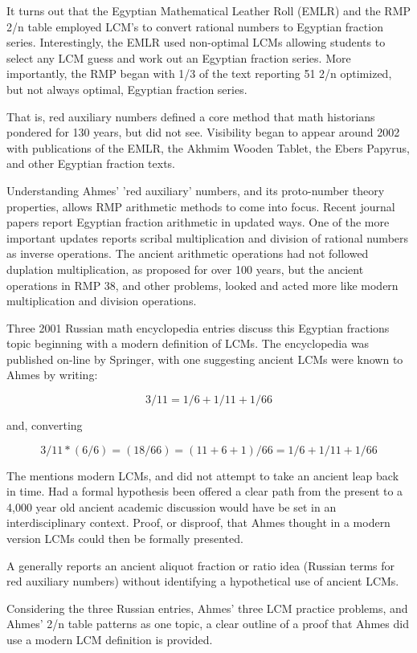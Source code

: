 \documentclass[12pt]{article}
\begin{document}
It turns out that the Egyptian Mathematical Leather Roll (EMLR) and the RMP 2/n table employed LCM's to convert rational numbers to Egyptian fraction series. Interestingly, the EMLR used non-optimal LCMs allowing students to select any LCM guess and work out an Egyptian fraction series. More importantly, the RMP began with 1/3 of the text reporting 51 2/n optimized, but not always optimal, Egyptian fraction series.

That is, red auxiliary numbers defined a core method that math historians pondered for 130 years, but did not see. Visibility began to appear around 2002 with publications of the EMLR, the Akhmim Wooden Tablet, the Ebers Papyrus, and other Egyptian fraction texts.

Understanding Ahmes' 'red auxiliary' numbers, and its proto-number theory properties, allows RMP arithmetic methods to come into focus. Recent journal papers report Egyptian fraction arithmetic in updated ways. One of the more important updates reports scribal multiplication and division of rational numbers as inverse operations. The ancient arithmetic operations had not followed duplation multiplication, as proposed for over 100 years, but the ancient operations in RMP 38, and other problems, looked and acted more like modern multiplication and division operations.

Three 2001 Russian math encyclopedia entries discuss this Egyptian fractions topic beginning with a modern definition of LCMs. The encyclopedia was published on-line by Springer, with one  suggesting ancient LCMs were known to Ahmes by writing:

$$3/11 = 1/6 + 1/11 + 1/66$$

and, converting 

$$3/11* (6/6) = (18/66) = (11 + 6+ 1)/66 = 1/6 + 1/11+ 1/66$$

The  mentions modern LCMs, and did not attempt to take an ancient leap back in time. Had a formal hypothesis been offered a clear path from the present to a 4,000 year old ancient academic discussion would have be set in an interdisciplinary context.  Proof, or disproof, that Ahmes thought in a modern version LCMs could then be formally presented.

A  generally reports an ancient aliquot fraction or ratio idea (Russian terms for red auxiliary numbers) without identifying a hypothetical use of ancient LCMs.

Considering the three Russian entries, Ahmes' three LCM practice problems, and Ahmes' 2/n table patterns as one topic, a clear outline of a proof that Ahmes did use a modern LCM definition is provided.






\end{document}
